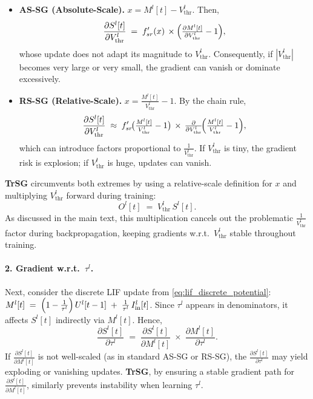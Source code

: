 \begin{itemize}
    \item \textbf{AS-SG (Absolute-Scale).}  
    \(
    x = M^l[t] - V_{\text{thr}}^l.
    \)
    Then, 
    \[
    \frac{\partial S^l[t]}{\partial V_{\text{thr}}^l}
    \;=\;
    f_{sr}'(x)\,\times \Bigl(\tfrac{\partial M^l[t]}{\partial V_{\text{thr}}^l} - 1\Bigr),
    \]
    whose update does not adapt its magnitude to \(V_{\text{thr}}^l\). Consequently, if \(|V_{\text{thr}}^l|\) becomes very large or very small, the gradient can vanish or dominate excessively.

    \item \textbf{RS-SG (Relative-Scale).}  
    \(
    x = \tfrac{M^l[t]}{V_{\text{thr}}^l} - 1.
    \)
    By the chain rule,
    \[
    \frac{\partial S^l[t]}{\partial V_{\text{thr}}^l}
    \;\approx\;
    f_{sr}'\!\bigl(\tfrac{M^l[t]}{V_{\text{thr}}^l}-1\bigr)\,\times\,\tfrac{\partial}{\partial V_{\text{thr}}^l}\!\Bigl(\tfrac{M^l[t]}{V_{\text{thr}}^l}-1\Bigr),
    \]
    which can introduce factors proportional to \(\tfrac{1}{V_{\text{thr}}^l}\). If \(V_{\text{thr}}^l\) is tiny, the gradient risk is explosion; if \(V_{\text{thr}}^l\) is huge, updates can vanish.
\end{itemize}

\textbf{TrSG} circumvents both extremes by using a relative-scale definition for \(x\) and multiplying \(V_{\text{thr}}^l\) forward during training:
\[
O^l[t] \;=\; V_{\text{thr}}^l\,S^l[t].
\]
As discussed in the main text, this multiplication cancels out the problematic \(\tfrac{1}{V_{\text{thr}}^l}\) factor during backpropagation, keeping gradients w.r.t.\ \(V_{\text{thr}}^l\) stable throughout training.

\paragraph{2. Gradient w.r.t.\ \texorpdfstring{\(\tau^l\)}{tau}.}
Next, consider the discrete LIF update from \cref{eq:lif_discrete_potential}:
\(
M^l[t]
\;=\;
\Bigl(1 - \tfrac{1}{\tau^l}\Bigr)\,U^l[t-1]
\;+\;
\tfrac{1}{\tau^l}\,I_{\text{in}}^l[t]
\).
Since \(\tau^l\) appears in denominators, it affects \(S^l[t]\) indirectly via \(M^l[t]\). Hence,
\[
\frac{\partial S^l[t]}{\partial \tau^l}
\;=\;
\frac{\partial S^l[t]}{\partial M^l[t]}
\;\times\;
\frac{\partial M^l[t]}{\partial \tau^l}.
\]
If \(\tfrac{\partial S^l[t]}{\partial M^l[t]}\) is not well-scaled (as in standard AS-SG or RS-SG), the \(\tfrac{\partial S^l[t]}{\partial \tau^l}\) may yield exploding or vanishing updates. 
\textbf{TrSG}, by ensuring a stable gradient path for \(\tfrac{\partial S^l[t]}{\partial M^l[t]}\), similarly prevents instability when learning \(\tau^l\).

